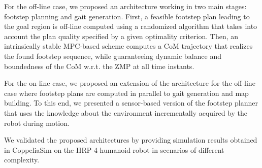 For the off-line case, we proposed an architecture working in two main stages:
footstep planning and gait generation.
First, a feasible footstep plan leading to the goal region is off-line computed
using a randomized algorithm that takes into account the plan quality specified
by a given optimality criterion.
Then, an intrinsically stable MPC-based scheme computes a CoM trajectory that
realizes the found footstep sequence, while guaranteeing dynamic balance and
boundedness of the CoM w.r.t. the ZMP at all time instants.

For the on-line case, we proposed an extension of the architecture for the
off-line case where footstep plans are computed in parallel to gait generation
and map building.
To this end, we presented a sensor-based version of the footstep planner that
uses the knowledge about the environment incrementally acquired by the robot
during motion.

We validated  the proposed architectures by providing simulation results
obtained in CoppeliaSim on the HRP-4 humanoid robot in scenarios of different
complexity.


